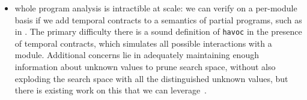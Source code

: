 \begin{itemize}
{}
%
\item{whole program analysis is intractible at scale:
%
we can verify on a per-module basis if we add temporal contracts to a semantics of partial programs, such as in \citet{dvanhorn:TobinHochstadt2012Higherorder}.
%
The primary difficulty there is a sound definition of {\tt havoc} in the presence of temporal contracts, which simulates all possible interactions with a module.
%
Additional concerns lie in adequately maintaining enough information about unknown values to prune search space, without also exploding the search space with all the distinguished unknown values, but there is existing work on this that we can leverage~\citep{ianjohnson:DBLP:journals/cacm/DilligDA10}.
}
\end{itemize}
%
%
